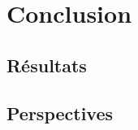 \documentclass[12pt]{article}
\begin{document}
\setcounter{secnumdepth}{0}
\section{Conclusion}
    \subsection{Résultats}
    \subsection{Perspectives}

       

\end{document}
